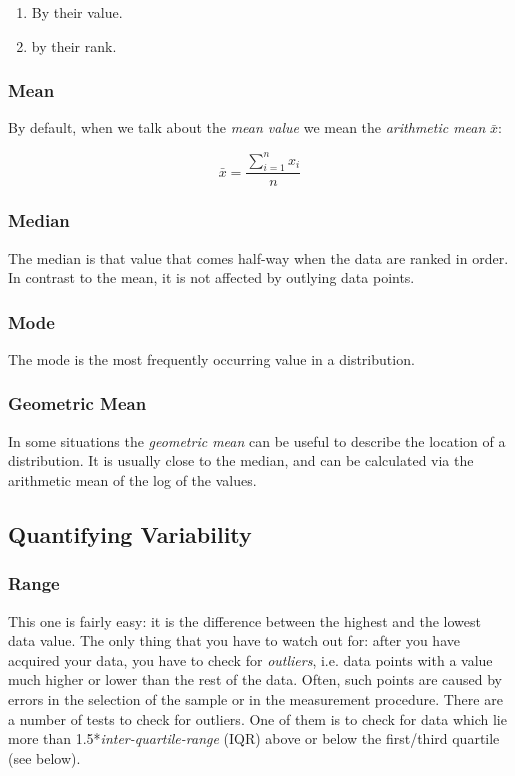 \begin{enumerate}
  \item By their value.
  \item by their \gls{rank}.
\end{enumerate}

\subsubsection{Mean} 
By default, when we talk about the \emph{mean value} we mean the \emph{arithmetic mean} $\bar{x}$:

\begin{equation}
  \bar{x} = \frac{{\sum\limits_{i = 1}^n {{x_i}} }}{n}
\end{equation}

\subsubsection{Median} 
The \gls{median} is that value that comes half-way when the data are ranked in order.
In contrast to the mean, it is not affected by outlying data points.

\subsubsection{Mode} 
The \gls{mode} is the most frequently occurring value in a distribution.

\subsubsection{Geometric Mean}
In some situations the \emph{geometric mean} can be useful to describe the location of a distribution. It is usually close to the median, and can be calculated via the arithmetic mean of the log of the values.

\subsection{Quantifying Variability}\label{sec:centiles}

\subsubsection{Range}
This one is fairly easy: it is the difference between the highest and the lowest data value.
The only thing that you have to watch out for: after you have acquired your data, you have to check for \emph{outliers}, i.e. data points with a value much higher or lower than the rest of the data. Often, such points are caused by errors in the selection of the sample or in the measurement procedure. There are a number of tests to check for outliers. One of them is to check for data which lie more than 1.5*\emph{inter-quartile-range} (IQR) above or below the first/third quartile (see below).


